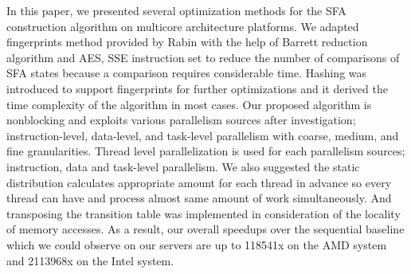 \documentclass[10pt, conference, compsocconf]{IEEEtran}
\begin{document}
In this paper, we presented several optimization methods for 
the SFA construction algorithm on multicore architecture platforms.
We adapted fingerprints method provided by Rabin with the help of Barrett
reduction algorithm and AES, SSE instruction set to reduce the number of comparisons of
SFA states because a comparison requires considerable time.
Hashing was introduced to support fingerprints for further
optimizations and it derived the  time complexity of the algorithm in most 
cases. Our proposed algorithm is nonblocking and exploits various
parallelism sources after investigation; instruction-level, data-level, and task-level
parallelism with coarse, medium, and fine granularities. Thread level parallelization is used for each parallelism sources; instruction, data and task-level parallelism.
We also suggested the static distribution calculates appropriate amount for each thread in advance so every thread
can have and process almost same amount of work simultaneously. 
And transposing the transition table was implemented in consideration of the locality of memory accesses.
As a result, our overall speedups over the sequential baseline which we could observe on our servers are up to 118541x on the AMD system and 2113968x on the Intel system.

















\end{document}
